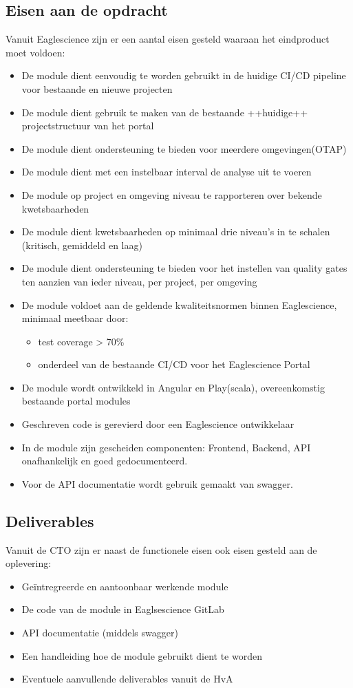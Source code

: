 \subsection{Eisen aan de opdracht}
Vanuit Eaglescience zijn er een aantal eisen gesteld waaraan het eindproduct moet voldoen:
\begin{itemize}
\item De module dient eenvoudig te worden gebruikt in de huidige CI/CD pipeline voor bestaande en nieuwe projecten
\item De module dient gebruik te maken van de bestaande ++huidige++ projectstructuur van het portal 
\item De module dient ondersteuning te bieden voor meerdere omgevingen(OTAP)
\item De module dient met een instelbaar interval de analyse uit te voeren
\item De module op project en omgeving niveau te rapporteren over bekende kwetsbaarheden
\item De module dient kwetsbaarheden op minimaal drie niveau’s in te schalen (kritisch, gemiddeld en laag)
\item De module dient ondersteuning te bieden voor het instellen van quality gates ten aanzien van ieder niveau, per project, per omgeving
\item De module voldoet aan de geldende kwaliteitsnormen binnen Eaglescience, minimaal meetbaar door:
	\begin{itemize}
	\item test coverage > 70\%
	\item onderdeel van de bestaande CI/CD voor het Eaglescience Portal
	\end{itemize}
\item De module wordt ontwikkeld in Angular en Play(scala), overeenkomstig bestaande portal modules
\item Geschreven code is gerevierd door een Eaglescience ontwikkelaar
\item In de module zijn gescheiden componenten: Frontend, Backend, API onafhankelijk en goed gedocumenteerd.
\item Voor de API documentatie wordt gebruik gemaakt van swagger.
\end{itemize}

\subsection{Deliverables}
Vanuit de CTO zijn er naast de functionele eisen ook eisen gesteld aan de oplevering:
\begin{itemize}
\item Geïntregreerde en aantoonbaar werkende module
\item De code van de module in Eaglsescience GitLab
\item API documentatie (middels swagger)
\item Een handleiding hoe de module gebruikt dient te worden
\item Eventuele aanvullende deliverables vanuit de HvA
\end{itemize}
